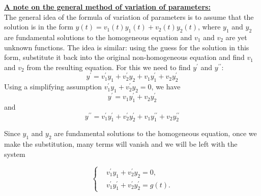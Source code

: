\documentclass[11pt]{article}
\begin{document}
\underline{\textbf{A note on the general method of variation of parameters:}} \\

The general idea of the formula of variation of parameters is to assume that
the solution is in the form $y(t) = v_1(t) y_1(t) + v_2(t) y_2(t)$, where
$y_1$ and $y_2$ are fundamental solutions to the homogeneous equation and
$v_1$ and $v_2$ are yet unknown functions. The idea is similar: using the
guess for the solution in this form, substitute it back into the original
non-homogeneous equation and find $v_1$ and $v_2$ from the resulting equation.
For this we need to find $y^{\prime}$ and $y^{\prime \prime}$:
\[y^{\prime} = v_1^{\prime} y_1 + v_2^{\prime} y_2 + v_1 y_1^{\prime} + v_2 y_2^{\prime} \]
Using a simplifying assumption $v_1^{\prime} y_1 + v_2^{\prime} y_2 = 0$, we have
\[y^{\prime} = v_1 y_1^{\prime} + v_2 y_2^{\prime}\]
and
\[y^{\prime \prime} = v_1^{\prime} y_1^{\prime} + v_2^{\prime} y_2^{\prime} +
  v_1 y_1^{\prime \prime} + v_2 y_2^{\prime \prime} \]

Since $y_1$ and $y_2$ are fundamental solutions to the homogeneous equation,
once we make the substitution, many terms will vanish and we will be left with the system

\begin{equation}
  \left\{
  \begin{aligned}
    & v_1^{\prime} y_1 + v_2^{\prime} y_2 = 0, \\
    & v_1^{\prime} y_1^{\prime} + v_2^{\prime} y_2^{\prime} = g(t).
  \end{aligned}
  \right.
\end{equation}
\end{document}
